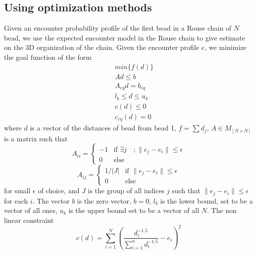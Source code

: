 \documentclass[12pt]{article}
\begin{document}
\subsection{Using optimization methods}\label{subsection_optimizationMethods}
Given an encounter probability profile of the first bead in a Rouse chain of $N$ bead, we use the expected encounter model in the Rouse chain to give estimate on the 3D organization of the chain. Given the encounter profile $e$, we minimize the goal function of the form
\begin{eqnarray}
&& min\{f(d)\}\\
&& Ad\leq b\\
&& A_{eq}d=b_{eq}\\
&& l_b\leq d\leq u_b\\
&& c(d)\leq0\\
&& c_{eq}(d)=0
\end{eqnarray}
where $d$ is a vector of the distances of bead from bead 1, $f=\sum{d_j}$, $A\in M_{[N\times N]}$ is a matrix such that
\begin{equation}
A_{ii} =
\left\{
	\begin{array}{ll}
		 -1 & \mbox{if } \exists j \quad ;\|e_j-e_i\|\leq \epsilon \\
		 0 & \mbox{else} 
	\end{array}
\right.
\end{equation}
\begin{equation}
A_{ij} =
\left\{
	\begin{array}{ll}
		1/|J|  & \mbox{if } \|e_j-e_i\|\leq \epsilon \\
		0 & \mbox{else } 
	\end{array}
\right.
\end{equation}
for small $\epsilon$ of choice, and $J$ is the group of all indices $j$ such that $\|e_j-e_i\|\leq \epsilon$ for each $i$. The vector $b$ is the zero vector,  $b=0$, $l_b$ is the lower bound, set to be a vector of all ones, $u_b$ is the upper bound set to be a vector of all $N$. The non linear constraint 
\begin{equation}
c(d) = \sum_{i=1}^N \left(\frac{d_i^{-1.5}}{\sum_{i=1}^n d_i^{-1.5}}-e_i\right)^2
\end{equation}
\end{document}
